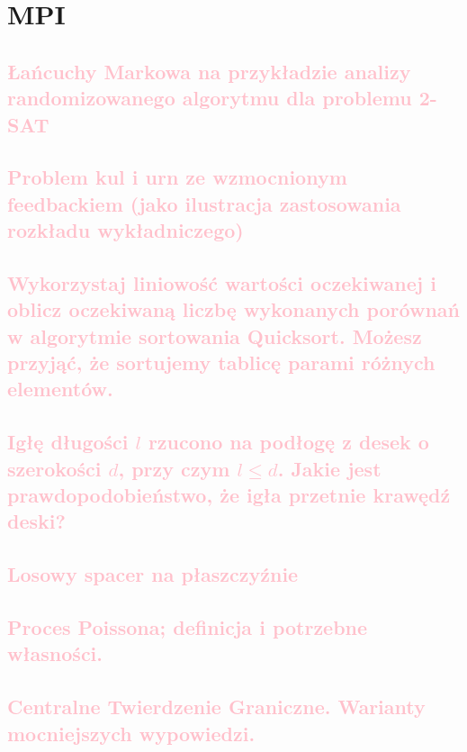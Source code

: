 \chapter{MPI}

\section{\textcolor{pink}{Łańcuchy Markowa na przykładzie analizy randomizowanego algorytmu dla problemu 2-SAT}}


\section{\textcolor{pink}{Problem kul i urn ze wzmocnionym feedbackiem (jako ilustracja zastosowania rozkładu wykładniczego)}}


\section{\textcolor{pink}{Wykorzystaj liniowość wartości oczekiwanej i oblicz oczekiwaną liczbę wykonanych porównań w algorytmie sortowania Quicksort. Możesz przyjąć, że sortujemy tablicę parami różnych elementów.}}


\section{\textcolor{pink}{Igłę długości \texorpdfstring{\(l\)}{l} rzucono na podłogę z desek o szerokości \texorpdfstring{\(d\)}{d}, przy czym \texorpdfstring{\(l \leq d\)}{l <= d}. Jakie jest prawdopodobieństwo, że igła przetnie krawędź deski?}}


\section{\textcolor{pink}{Losowy spacer na płaszczyźnie}}


\section{\textcolor{pink}{Proces Poissona; definicja i potrzebne własności.}}


\section{\textcolor{pink}{Centralne Twierdzenie Graniczne. Warianty mocniejszych wypowiedzi.}}

